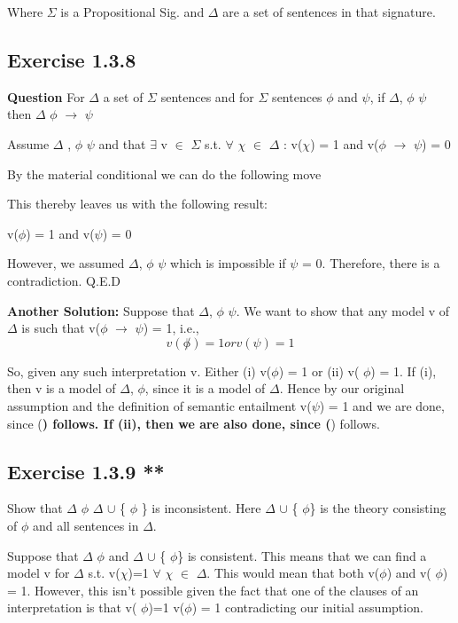 \documentclass[11pt]{article}
\begin{document}
Where \(\Sigma\) is a Propositional Sig. and \(\Delta\) are a set of sentences in that signature.

\subsection{Exercise 1.3.8}
\label{sec:org23e4369}


\textbf{Question} For \(\Delta\) a set of \(\Sigma\) sentences and for \(\Sigma\) sentences \(\phi\) and \(\psi\), if \(\Delta\), \(\phi\) \vDash \(\psi\)
then \(\Delta\) \vDash \(\phi\) \(\rightarrow\) \(\psi\)

Assume \(\Delta\) , \(\phi\) \vDash \(\psi\) and that \(\exists\) v \(\in\) \(\Sigma\) s.t. \(\forall\) \(\chi\) \(\in\) \(\Delta\) : 
v(\(\chi\)) = 1 and v(\(\phi\) \(\rightarrow\) \(\psi\)) = 0

By the material conditional we can do the following move

This thereby leaves us with the following result:

v(\(\phi\)) = 1 and v(\(\psi\)) = 0

However, we assumed \(\Delta\), \(\phi\) \vDash \(\psi\) which is impossible if
\(\psi\) = 0. Therefore, there is a contradiction. Q.E.D \square

\textbf{Another Solution:}
Suppose that \(\Delta\), \(\phi\) \vDash \(\psi\). We want to show that any model v of \(\Delta\) is such that
v(\(\phi\) \(\rightarrow\) \(\psi\)) = 1, i.e.,
\[v(\not \phi) = 1 or v(\psi) = 1\]

So, given any such interpretation v. Either (i) v(\(\phi\)) = 1 or (ii) v(\textlnot{} \(\phi\)) = 1.
If (i), then v is a model of \(\Delta\), \(\phi\), since it is a model of \(\Delta\). Hence by our original assumption and
the definition of semantic entailment v(\(\psi\)) = 1 and we are done, since (\textbf{) follows.
If (ii), then we are also done, since (}) follows. \square

\subsection{Exercise 1.3.9 **}
\label{sec:org918cb56}
Show that \(\Delta\) \vDash \(\phi\) \iff \(\Delta\) \(\cup\) \{\textlnot{} \(\phi\) \} is inconsistent. Here
\(\Delta\) \(\cup\) \{\textlnot{} \(\phi\)\} is the theory consisting of \textlnot{} \(\phi\) and all sentences in \(\Delta\).

Suppose that \(\Delta\) \vDash \(\phi\) and \(\Delta\) \(\cup\) \{\textlnot{} \(\phi\)\} is consistent. This means
that we can find a model v for \(\Delta\) s.t. v(\(\chi\))=1 \(\forall\) \(\chi\) \(\in\) \(\Delta\). This would
mean that both v(\(\phi\)) and v(\textlnot{} \(\phi\)) = 1. However, this isn't possible given the fact
that one of the clauses of an interpretation is that v(\textlnot{} \(\phi\))=1 \iff v(\(\phi\)) = 1 contradicting
our initial assumption.\square
\end{document}
